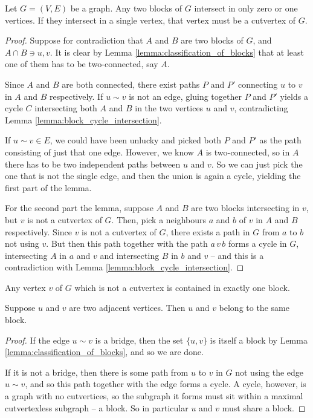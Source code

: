 \documentclass[nobib]{tufte-handout}
\begin{document}
\begin{lemma}
  Let $G = (V,E)$ be a graph. Any two blocks of $G$ intersect in only zero or one vertices. If they intersect in a single vertex, that vertex must be a cutvertex of $G$.

  \begin{proof}
    Suppose for contradiction that $A$ and $B$ are two blocks of $G$, and $A \cap B \ni u,v$. It is clear by Lemma \ref{lemma:classification_of_blocks} that at least one of them has to be two-connected, say $A$.
    
    Since $A$ and $B$ are both connected, there exist paths $P$ and $P'$ connecting $u$ to $v$ in $A$ and $B$ respectively. If $u \sim v$ is not an edge, gluing together $P$ and $P'$ yields a cycle $C$ intersecting both $A$ and $B$ in the two vertices $u$ and $v$, contradicting Lemma \ref{lemma:block_cycle_intersection}.

    If $u\sim v \in E$, we could have been unlucky and picked both $P$ and $P'$ as the path consisting of just that one edge. However, we know $A$ is two-connected, so in $A$ there has to be two independent paths between $u$ and $v$. So we can just pick the one that is not the single edge, and then the union is again a cycle, yielding the first part of the lemma.

    For the second part the lemma, suppose $A$ and $B$ are two blocks intersecting in $v$, but $v$ is not a cutvertex of $G$. Then, pick a neighbours $a$ and $b$ of $v$ in $A$ and $B$ respectively. Since $v$ is not a cutvertex of $G$, there exists a path in $G$ from $a$ to $b$ not using $v$. But then this path together with the path $a\, v\, b$ forms a cycle in $G$, intersecting $A$ in $a$ and $v$ and intersecting $B$ in $b$ and $v$ -- and this is a contradiction with Lemma \ref{lemma:block_cycle_intersection}.
  \end{proof}
\end{lemma}

\begin{corollary}\label{cor:noncutvertices_single_block}
  Any vertex $v$ of $G$ which is not a cutvertex is contained in exactly one block.
\end{corollary}

\begin{lemma}\label{lemma:edges_imply_same_block}
  Suppose $u$ and $v$ are two adjacent vertices. Then $u$ and $v$ belong to the same block.

  \begin{proof}
    If the edge $u \sim v$ is a bridge, then the set $\{u,v\}$ is itself a block by Lemma \ref{lemma:classification_of_blocks}, and so we are done.

    If it is not a bridge, then there is some path from $u$ to $v$ in $G$ not using the edge $u \sim v$, and so this path together with the edge forms a cycle. A cycle, however, is a graph with no cutvertices, so the subgraph it forms must sit within a maximal cutvertexless subgraph -- a block. So in particular $u$ and $v$ must share a block.
  \end{proof}
\end{lemma}
\end{document}
